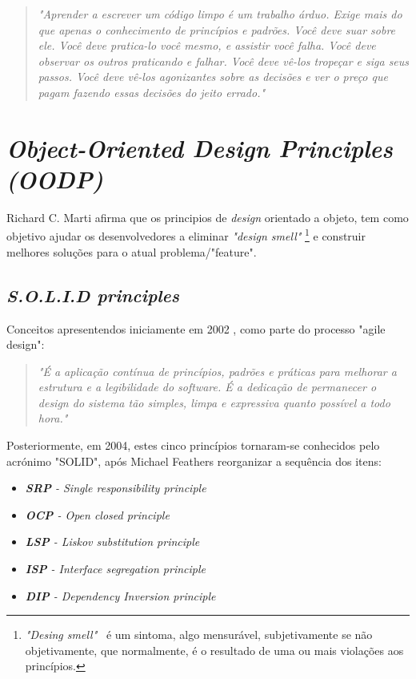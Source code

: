 \documentclass[12pt]{article}
\begin{document}
\begin{quotation}
\textit{"Aprender a escrever um código limpo é um trabalho árduo. Exige mais do que apenas o conhecimento de princípios e padrões. Você deve suar sobre ele. Você deve pratica-lo você mesmo, e assistir você falha. Você deve observar os outros praticando e falhar. Você deve vê-los tropeçar e siga seus passos. Você deve vê-los agonizantes sobre as decisões e ver o preço que pagam fazendo essas decisões do jeito errado." }
\end{quotation}

\section{\textit{Object-Oriented Design Principles (OODP)}} \label{sec:oopd}

 Richard C. Marti \cite{ROBERT_MARTIN_AGILE_SW_DEV_PPP} afirma que os principios de \textit{design} orientado a objeto, tem como objetivo ajudar os desenvolvedores a eliminar \textit{"design smell"} \footnote{\textit{"Desing smell"}\ \cite{ROBERT_MARTIN_AGILE_SW_DEV_PPP} é um sintoma, algo mensurável, subjetivamente se não objetivamente, que normalmente, é o resultado de uma ou mais violações aos princípios.} e construir melhores soluções para o atual problema/"feature".

\subsection{\textit{S.O.L.I.D principles}} \label{sec:solid}

 Conceitos apresentendos iniciamente em 2002 \cite{ROBERT_MARTIN_AGILE_SW_DEV_PPP}, como parte do processo "agile design":

 \begin{quote}
\textit{"É a aplicação contínua de princípios, padrões e práticas para melhorar a estrutura e a legibilidade do software. É a dedicação de permanecer o design do sistema tão simples, limpa e expressiva quanto possível a todo hora."}
 \end{quote}

 Posteriormente, em 2004, estes cinco princípios tornaram-se conhecidos pelo acrónimo "SOLID", após Michael Feathers reorganizar a sequência dos itens:

\begin{itemize}
	\item \textit{\textbf{SRP} - Single responsibility principle}
	\item \textit{\textbf{OCP} - Open closed principle}
	\item \textit{\textbf{LSP} - Liskov substitution principle}
	\item \textit{\textbf{ISP} - Interface segregation principle}
	\item \textit{\textbf{DIP} - Dependency Inversion principle}
\end{itemize}
\end{document}
